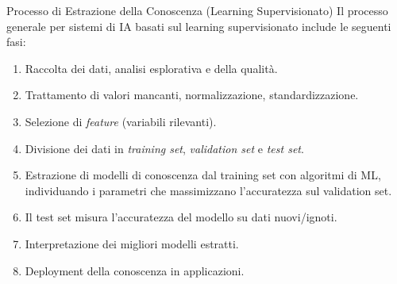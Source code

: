 \documentclass{article}
\begin{document}
\begin{examplebox}{Processo di Estrazione della Conoscenza (Learning Supervisionato) }
    Il processo generale per sistemi di IA basati sul learning supervisionato include le seguenti fasi:
    \begin{enumerate}
        \item Raccolta dei dati, analisi esplorativa e della qualità.
        \item Trattamento di valori mancanti, normalizzazione, standardizzazione.
        \item Selezione di \textit{feature} (variabili rilevanti).
        \item Divisione dei dati in \textit{training set}, \textit{validation set} e \textit{test set}.
        \item Estrazione di modelli di conoscenza dal training set con algoritmi di ML, individuando i parametri che massimizzano l'accuratezza sul validation set.
        \item Il test set misura l'accuratezza del modello su dati nuovi/ignoti.
        \item Interpretazione dei migliori modelli estratti.
        \item Deployment della conoscenza in applicazioni.
    \end{enumerate}
\end{examplebox}
\end{document}
